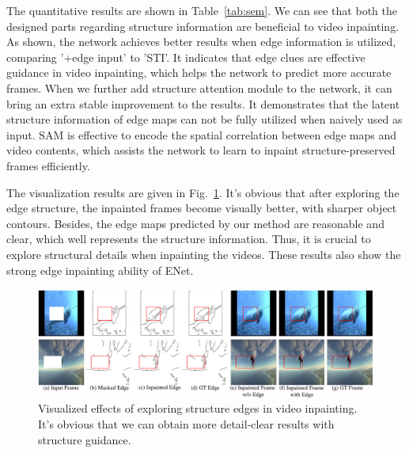 The quantitative results are shown in Table~\ref{tab:sem}. We can see that both the designed parts regarding structure information are beneficial to video inpainting.
As shown, the network achieves better results when edge information is utilized, comparing '+edge input' to 'STI'. It indicates that edge clues are effective guidance in video inpainting, which helps the network to predict more accurate frames.
When we further add structure attention module to the network, it can bring an extra stable improvement to the results. It demonstrates that the latent structure information of edge maps can not be fully utilized when naively used as input. SAM is effective to encode the spatial correlation between edge maps and video contents, which assists the network to learn to inpaint structure-preserved frames efficiently.




The visualization results are given in Fig.~\ref{edgevis}. It's obvious that after exploring the edge structure, the inpainted frames become visually better, with sharper object contours. Besides, the edge maps predicted by our method are reasonable and clear, which well represents the structure information.
Thus, it is crucial to explore structural details when inpainting the videos.
These results also show the strong edge inpainting ability of ENet.

\begin{figure}[t]
	\centering
	\includegraphics[width=0.97\columnwidth]{edgevis} %
	\caption{Visualized effects of exploring structure edges in video inpainting. It's obvious that we can obtain more detail-clear results with structure guidance.}
	\label{edgevis}
\end{figure}




